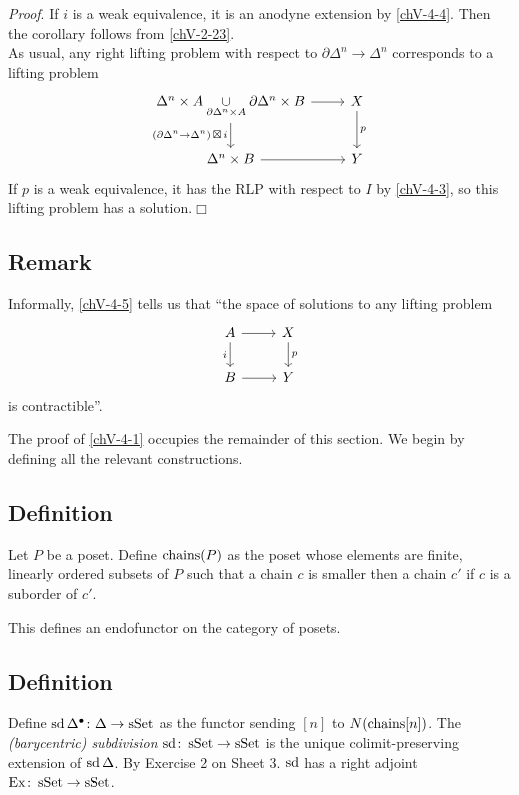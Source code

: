        \emph{Proof}. If $i$ is a weak equivalence, it is an anodyne extension by \ref{chV-4-4}. Then the corollary follows from \ref{chV-2-23}.\\
        As usual, any right lifting problem with respect to $\partial \Delta^n \to \Delta^n$ corresponds to a lifting problem
        \begin{equation*}
            \begin{tikzcd}
                \Delta^n \times A \underset{\partial \Delta^n \times A}{\cup} \partial \Delta^n \times B \arrow[d, "{(\partial \Delta^n \to \Delta^n)} \, \boxtimes \, i"'] \arrow[r] & X \arrow[d, "p"] \\
                \Delta^n \times B \arrow[r] & Y
            \end{tikzcd}
        \end{equation*}
        If $p$ is a weak equivalence, it has the RLP with respect to $I$ by \ref{chV-4-3}, so this lifting problem has a solution.\hfill$\Box$

    \subsection{Remark}\label{chV-4-6}
        Informally, \ref{chV-4-5} tells us that ``the space of solutions to any lifting problem
        \begin{equation*}
            \begin{tikzcd}
                A \arrow[d, "i"'] \arrow[r] & X \arrow[d, "p"] \\
                B \arrow[r] & Y
            \end{tikzcd}
        \end{equation*}
        is contractible''.
        \medskip

        The proof of \ref{chV-4-1} occupies the remainder of this section. We begin by defining all the relevant constructions.

    \subsection{Definition}\label{chV-4-7}
        Let $P$ be a poset. Define $\operatorname{chains}(P)$ as the poset whose elements are finite, linearly ordered subsets of $P$ such that a chain $c$ is smaller then a chain $c'$ if $c$ is a suborder of $c'$.
        \medskip

        This defines an endofunctor on the category of posets.

    \subsection{Definition}\label{chV-4-8}
        Define $\operatorname{sd} \Delta^{\bullet} \colon \Delta \to \operatorname{sSet}$ as the functor sending $[n]$ to $N(\operatorname{chains}[n])$. The \emph{(barycentric) subdivision} $\operatorname{sd} \colon \operatorname{sSet} \to \operatorname{sSet}$ is the unique colimit-preserving extension of $\operatorname{sd} \Delta$. By Exercise 2 on Sheet 3. $\operatorname{sd}$ has a right adjoint $\operatorname{Ex} \colon \operatorname{sSet} \to \operatorname{sSet}$.

